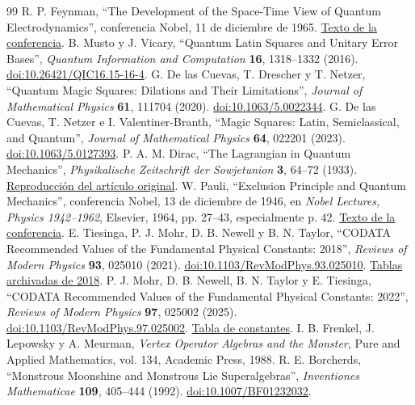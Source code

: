 \begin{thebibliography}{99}
 R. P. Feynman, ``The Development of the Space-Time View of Quantum Electrodynamics'', conferencia Nobel, 11 de diciembre de 1965. \href{https://www.nobelprize.org/prizes/physics/1965/feynman/lecture/}{Texto de la conferencia}.
 B. Musto y J. Vicary, ``Quantum Latin Squares and Unitary Error Bases'', \emph{Quantum Information and Computation} \textbf{16}, 1318--1332 (2016). \href{https://doi.org/10.26421/QIC16.15-16-4}{doi:10.26421/QIC16.15-16-4}.
 G. De las Cuevas, T. Drescher y T. Netzer, ``Quantum Magic Squares: Dilations and Their Limitations'', \emph{Journal of Mathematical Physics} \textbf{61}, 111704 (2020). \href{https://doi.org/10.1063/5.0022344}{doi:10.1063/5.0022344}.
 G. De las Cuevas, T. Netzer e I. Valentiner-Branth, ``Magic Squares: Latin, Semiclassical, and Quantum'', \emph{Journal of Mathematical Physics} \textbf{64}, 022201 (2023). \href{https://doi.org/10.1063/5.0127393}{doi:10.1063/5.0127393}.
 P. A. M. Dirac, ``The Lagrangian in Quantum Mechanics'', \emph{Physikalische Zeitschrift der Sowjetunion} \textbf{3}, 64--72 (1933). \href{https://www.informationphilosopher.com/solutions/scientists/dirac/Lagrangian_1933.pdf}{Reproducción del artículo original}.
 W. Pauli, ``Exclusion Principle and Quantum Mechanics'', conferencia Nobel, 13 de diciembre de 1946, en \emph{Nobel Lectures, Physics 1942--1962}, Elsevier, 1964, pp. 27--43, especialmente p. 42. \href{https://www.nobelprize.org/uploads/2018/06/pauli-lecture.pdf}{Texto de la conferencia}.
 E. Tiesinga, P. J. Mohr, D. B. Newell y B. N. Taylor, ``CODATA Recommended Values of the Fundamental Physical Constants: 2018'', \emph{Reviews of Modern Physics} \textbf{93}, 025010 (2021). \href{https://doi.org/10.1103/RevModPhys.93.025010}{doi:10.1103/RevModPhys.93.025010}. \href{https://physics.nist.gov/cuu/Constants/ArchiveASCII/allascii_2018.txt}{Tablas archivadas de 2018}.
 P. J. Mohr, D. B. Newell, B. N. Taylor y E. Tiesinga, ``CODATA Recommended Values of the Fundamental Physical Constants: 2022'', \emph{Reviews of Modern Physics} \textbf{97}, 025002 (2025). \href{https://doi.org/10.1103/RevModPhys.97.025002}{doi:10.1103/RevModPhys.97.025002}. \href{https://physics.nist.gov/cuu/Constants/Table/allascii.txt}{Tabla de constantes}.
 I. B. Frenkel, J. Lepowsky y A. Meurman, \emph{Vertex Operator Algebras and the Monster}, Pure and Applied Mathematics, vol. 134, Academic Press, 1988.
 R. E. Borcherds, ``Monstrous Moonshine and Monstrous Lie Superalgebras'', \emph{Inventiones Mathematicae} \textbf{109}, 405--444 (1992). \href{https://doi.org/10.1007/BF01232032}{doi:10.1007/BF01232032}.

\end{thebibliography}
